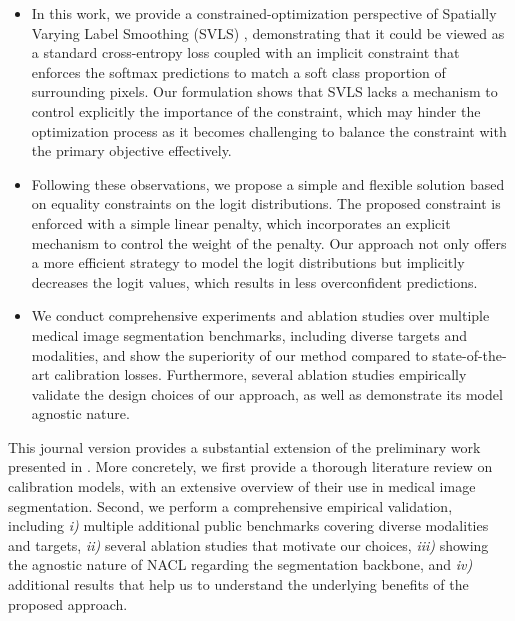 \documentclass[twocolumn,final,10pt]{elsarticle}
\newcommand{\rev}[1]{{\color{black}#1}}
\begin{document}
\begin{itemize}
    \item In this work, we provide a constrained-optimization perspective of Spatially Varying Label Smoothing (SVLS) \citep{islam2021spatially}, demonstrating that it could be viewed as a standard cross-entropy loss coupled with an implicit constraint that enforces the softmax predictions to match a soft class proportion of surrounding pixels. %
    Our formulation shows that SVLS lacks a %
    mechanism to control explicitly the importance of the constraint, which may hinder the optimization process as it becomes challenging to balance the constraint with the primary objective effectively. 

    \item Following these observations, we propose a simple and flexible solution based on equality constraints on the logit distributions. The proposed constraint is enforced with a simple linear penalty, which incorporates an explicit mechanism to control the weight of the penalty. Our approach not only offers a more efficient strategy to model the logit distributions but implicitly decreases the logit values, which results in less overconfident predictions. %

    \item We conduct comprehensive experiments and ablation studies over multiple medical image segmentation benchmarks, including diverse targets and modalities, and show the superiority of our method compared to state-of-the-art calibration losses. Furthermore, several ablation studies empirically validate the design choices of our approach, as well as demonstrate its model agnostic nature. 
    
\end{itemize}


\rev{This journal version provides a substantial extension of the preliminary work presented in \citep{murugesan2023trust}. More concretely, we first provide a thorough literature review on calibration models, with an extensive overview of their use in medical image segmentation. Second, we perform a  comprehensive empirical validation, including \textit{i)} multiple additional public benchmarks covering diverse modalities and targets, %
\textit{ii)} several ablation studies that motivate our choices, \textit{iii)} showing the agnostic nature of NACL regarding the segmentation backbone, and \textit{iv)} additional results that help us to understand the underlying benefits of the proposed approach.}
\end{document}
